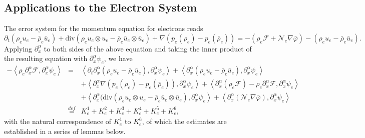 \documentclass[reqno,twoside,12pt,a4paper]{amsart}
\newcommand{\al}{\alpha}
\newcommand{\dive}{\mathrm{div}}
\newcommand{\pt}{\partial_t}
\newcommand{\pa}{\partial}
\newcommand{\D}{\nabla}
\newcommand{\vp}{\varphi}
\newcommand{\calf}{\mathcal{F}}
\newcommand{\Ne}{\mathcal{N}_e}
\numberwithin{equation}{section}
\begin{document}
\subsection*{Applications to the Electron System} The error system for the momentum equation for electrons reads
\[
\pt(\rho_e u_e-\bar{\rho}_e\bar{u}_e)+\dive(\rho_e u_e\otimes u_e-\bar{\rho}_e\bar{u}_e\otimes\bar{u}_e)+\D(p_e(\rho_e)-p_e(\bar{\rho}_e))=-(\rho_e\calf+\Ne\D\bar{\vp})-(\rho_e u_e-\bar{\rho}_e\bar{u}_e).
\]
Applying $\partial^\al_x$ to both sides of the above equation and taking the inner product of the resulting equation with $\partial^\al_x \psi_e$, we have
\begin{eqnarray*}
    -\left\langle \rho_e\pa_x^\al \calf,\partial^\al_x \psi_e\right\rangle&=& \left\langle \pt \partial^\al_x (\rho_e u_e-\bar{\rho}_e\bar{u}_e), \partial^\al_x \psi_e\right\rangle + \left\langle \partial^\al_x (\rho_e u_e-\bar{\rho}_e\bar{u}_e), \partial^\al_x \psi_e\right\rangle\nonumber\\
    &&+\left\langle \partial^\al_x \nabla (p_e(\rho_e)-p_e(\bar{\rho}_e)), \partial^\al_x \psi_e\right\rangle+\left<\pa_x^\al(\rho_e\calf)-\rho_e\pa_x^\al\calf, \pa_x^\al\psi_e\right>\nonumber\\
    &&+ \left\langle \partial^\al_x (\dive(\rho_e u_e\otimes u_e-\bar{\rho}_e\bar{u}_e\otimes\bar{u}_e), \partial^\al_x \psi_e\right\rangle +\left<\pa_x^\al(\Ne\D\bar{\vp}),\pa_x^\al\psi_e\right>\nonumber\\
    &\overset{def}{=} & K_e^1+K_e^2+K_e^3+K_e^4+K_e^5+K_e^6,
\end{eqnarray*}
with the natural correspondence of $K_e^1$ to $K_e^6$, of which the estimates are established in a series of lemmas below. 
\end{document}
